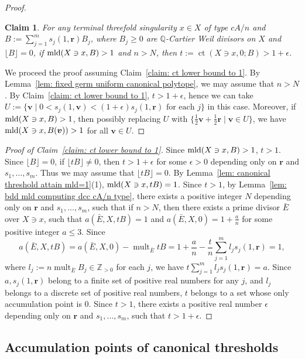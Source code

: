 \documentclass[11pt]{amsart}
\numberwithin{equation}{section}
\newcommand{\Qq}{\mathbb{Q}}
\newcommand{\Zz}{\mathbb{Z}}
\newcommand{\mld}{{\rm{mld}}}
\newcommand{\ct}{\operatorname{ct}}
\newcommand{\mult}{\operatorname{mult}}
\newtheorem{claim}[thm]{Claim}
\theoremstyle{definition}
\theoremstyle{definition}
\begin{document}
\begin{proof}
\begin{claim}
For any terminal threefold singularity $x\in X$ of type $cA/n$ and $B:=\sum_{j=1}^m s_j(1,\mathbf{r})B_j$, where $B_j\geq 0$ are $\Qq$-Cartier Weil divisors on $X$ and $\lfloor B\rfloor=0$, if $\mld(X\ni x,B)>1$ and $n>N$, then $t:=\ct(X\ni x,0;B)>1+\epsilon$.
\end{claim}

We proceed the proof assuming Claim~\ref{claim: ct lower bound to 1}. By Lemma~\ref{lem: fixed germ uniform canonical polytope}, we may assume that $n>N$. By Claim~\ref{claim: ct lower bound to 1}, $t> 1+\epsilon$, hence we can take $U:=\{\bm v\mid 0< s_j(1,\bm v)< (1+\epsilon)s_j(1,\bm r)\text{ for each $j$}\}$ in this case. Moreover, if $\mld(X\ni x, B)>1$, then possibly replacing $U$ with $\{\frac{1}{2}\bm v+\frac{1}{2}\bm r\mid \bm v\in U\}$, we have $\mld(X\ni x, B(\bm v))>1$ for all $\bm v\in U$.
\end{proof}

\begin{proof}[Proof of Claim~\ref{claim: ct lower bound to 1}] Since $\mld(X\ni x,B)>1$, $t>1$. Since $\lfloor B\rfloor=0$, if $\lfloor tB\rfloor\neq  0$, then $t>1+\epsilon$ for some $\epsilon>0$ depending only on $\bm r$ and $s_1,\dots,s_m$. Thus we may assume that $\lfloor tB\rfloor=0$. By Lemma~\ref{lem: canonical threshold attain mld=1}(1), $\mld(X\ni x, tB)=1$. Since $t>1$, by Lemma~\ref{lem: bdd mld computing dcc cA/n type}, there exists a positive integer $N$ depending only on $\bm r$ and $s_1,\dots,s_m$, such that if $n>N$, then there exists a prime divisor $\bar{E}$ over $X\ni x$, such that $a(\bar E,X,tB)=1$ and $a(\bar E,X,0)=1+\frac{a}{n}$ for some positive integer $a\leq 3$. Since $$a(\bar E,X,tB)=a(\bar E,X,0)-\mult_{\bar E} tB=1+\frac{a}{n}-\frac{t}{n}\sum_{j=1}^m l_js_j(1,\bm r)=1,$$ 
where $l_j:=n\mult_{\bar E}B_j\in \Zz_{>0}$ for each $j$, we have $t\sum_{j=1}^m l_js_j(1,\bm r)=a$. Since $a,s_j(1,\bm{r})$ belong to a finite set of positive real numbers for any $j$, and $l_j$ belongs to a discrete set of positive real numbers, $t$ belongs to a set whose only accumulation point is $0$. Since $t>1$, there exists a positive real number $\epsilon$ depending only on $\bm r$ and $s_1,\dots,s_m$, such that $t>1+\epsilon$.
\end{proof}



\subsection{Accumulation points of canonical thresholds}
\end{document}
